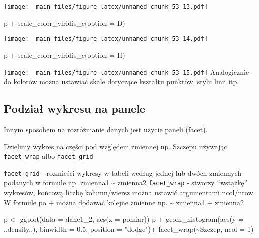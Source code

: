 \documentclass[
]{book}
\newenvironment{Shaded}{\begin{snugshade}}{\end{snugshade}}
\newcommand{\AttributeTok}[1]{\textcolor[rgb]{0.77,0.63,0.00}{#1}}
\newcommand{\DecValTok}[1]{\textcolor[rgb]{0.00,0.00,0.81}{#1}}
\newcommand{\FloatTok}[1]{\textcolor[rgb]{0.00,0.00,0.81}{#1}}
\newcommand{\FunctionTok}[1]{\textcolor[rgb]{0.00,0.00,0.00}{#1}}
\newcommand{\NormalTok}[1]{#1}
\newcommand{\OtherTok}[1]{\textcolor[rgb]{0.56,0.35,0.01}{#1}}
\newcommand{\SpecialCharTok}[1]{\textcolor[rgb]{0.00,0.00,0.00}{#1}}
\newcommand{\StringTok}[1]{\textcolor[rgb]{0.31,0.60,0.02}{#1}}
\begin{document}
\texttt{[image: \_main\_files/figure-latex/unnamed-chunk-53-13.pdf]}

\begin{Shaded}
\begin{Highlighting}[]
\NormalTok{p }\SpecialCharTok{+} \FunctionTok{scale\_color\_viridis\_c}\NormalTok{(}\AttributeTok{option =} \StringTok{\textquotesingle{}D\textquotesingle{}}\NormalTok{)}
\end{Highlighting}
\end{Shaded}

\texttt{[image: \_main\_files/figure-latex/unnamed-chunk-53-14.pdf]}

\begin{Shaded}
\begin{Highlighting}[]
\NormalTok{p }\SpecialCharTok{+} \FunctionTok{scale\_color\_viridis\_c}\NormalTok{(}\AttributeTok{option =} \StringTok{\textquotesingle{}H\textquotesingle{}}\NormalTok{)}
\end{Highlighting}
\end{Shaded}

\texttt{[image: \_main\_files/figure-latex/unnamed-chunk-53-15.pdf]}
Analogicznie do kolorów można ustawiać skale dotyczące kształtu punktów, stylu linii itp.

\hypertarget{podziaux142-wykresu-na-panele}{%
\subsection{Podział wykresu na panele}\label{podziaux142-wykresu-na-panele}}

Innym sposobem na rozróżnianie danych jest użycie paneli (facet).

Dzielimy wykres na części pod względem zmiennej np. Szczepu używając \texttt{facet\_wrap} albo \texttt{facet\_grid}

\texttt{facet\_grid} - rozmieści wykresy w tabeli według jednej lub dwóch zmiennych podanych w formule np. zmienna1 \textasciitilde{} zmienna2
\texttt{facet\_wrap} - stworzy ``wstążkę'' wykresów, końcową liczbę kolumn/wiersz można ustawić argumentami ncol/nrow. W formule po + można dodawać kolejne zmienne np. \textasciitilde{} zmienna1 + zmienna2

\begin{Shaded}
\begin{Highlighting}[]
\NormalTok{p }\OtherTok{\textless{}{-}} \FunctionTok{ggplot}\NormalTok{(}\AttributeTok{data =}\NormalTok{ dane1\_2, }\FunctionTok{aes}\NormalTok{(}\AttributeTok{x =}\NormalTok{ pomiar))}
\NormalTok{p }\SpecialCharTok{+} \FunctionTok{geom\_histogram}\NormalTok{(}\FunctionTok{aes}\NormalTok{(}\AttributeTok{y =}\NormalTok{ ..density..), }\AttributeTok{binwidth =} \FloatTok{0.5}\NormalTok{, }\AttributeTok{position =} \StringTok{"dodge"}\NormalTok{)}\SpecialCharTok{+}
  \FunctionTok{facet\_wrap}\NormalTok{(}\SpecialCharTok{\textasciitilde{}}\NormalTok{Szczep, }\AttributeTok{ncol =} \DecValTok{1}\NormalTok{)}
\end{Highlighting}
\end{Shaded}
\end{document}

